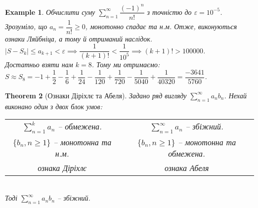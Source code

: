 \documentclass[a4paper, 10pt]{article}
\def\huge{\displaystyle}
\theoremstyle{theoremdd}
\newtheorem{theorem}{Theorem}[subsection]
\theoremstyle{theoremdd}
\theoremstyle{theoremdd}
\theoremstyle{theoremdd}
\theoremstyle{theoremdd}
\newtheorem{example}[theorem]{Example}
\theoremstyle{theoremdd}
\theoremstyle{theoremdd}
\theoremstyle{theoremdd}
\theoremstyle{theoremdd}
\begin{document}
\begin{example}
Обчислити суму $\huge\sum_{n=1}^\infty \dfrac{(-1)^n}{n!}$ з точністю до $\varepsilon = 10^{-5}$.\\
Зрозуміло, що $a_n = \dfrac{1}{n!} \geq 0$, монотонно спадає та н.м. Отже, виконуються ознаки Ляйбніца, а тому й отриманий наслідок.\\
$|S-S_k| \leq a_{k+1} < \varepsilon \implies \dfrac{1}{(k+1)!} < \dfrac{1}{10^5} \implies (k+1)! > 100000$.\\
Достатньо взяти нам $k = 8$. Тому ми отримаємо:\\
$S \approx S_8 = -1 + \dfrac{1}{2} - \dfrac{1}{6} + \dfrac{1}{24} - \dfrac{1}{120} + \dfrac{1}{720} - \dfrac{1}{5040} + \dfrac{1}{40320} = \dfrac{-3641}{5760}$.
\end{example}

\begin{theorem}[Ознаки Діріхлє та Абеля]
Задано ряд вигляду $\huge \sum_{n=1}^{\infty} a_n b_n$. Нехай виконано один з двох блок умов:\\
\begin{tabular}{c | c}
$\huge\sum_{n=1}^k a_n$ -- обмежена. & $\huge \sum_{n=1}^{\infty} a_n$ -- збіжний. \\
$\{b_n, n \geq 1\}$ -- монотонна та н.м. & $\{b_n, n \geq 1\}$ -- монотонна та обмежена.\\
\textit{ознака Діріхлє} & \textit{ознака Абеля}
\end{tabular} \\
Тоді $\huge \sum_{n=1}^{\infty} a_n b_n$ -- збіжний.
\end{theorem}
\end{document}
